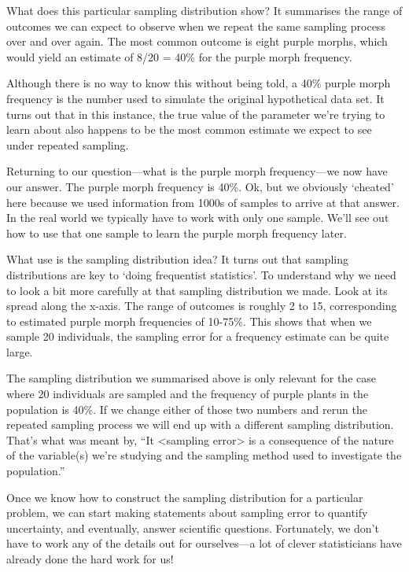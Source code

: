 \documentclass[
]{book}
\begin{document}
What does this particular sampling distribution show? It summarises the range of outcomes we can expect to observe when we repeat the same sampling process over and over again. The most common outcome is eight purple morphs, which would yield an estimate of 8/20 = 40\% for the purple morph frequency.

Although there is no way to know this without being told, a 40\% purple morph frequency is the number used to simulate the original hypothetical data set. It turns out that in this instance, the true value of the parameter we're trying to learn about also happens to be the most common estimate we expect to see under repeated sampling.

Returning to our question---what is the purple morph frequency---we now have our answer. The purple morph frequency is 40\%. Ok, but we obviously `cheated' here because we used information from 1000s of samples to arrive at that answer. In the real world we typically have to work with only one sample. We'll see out how to use that one sample to learn the purple morph frequency later.

What use is the sampling distribution idea? It turns out that sampling distributions are key to `doing frequentist statistics'. To understand why we need to look a bit more carefully at that sampling distribution we made. Look at its spread along the x-axis. The range of outcomes is roughly 2 to 15, corresponding to estimated purple morph frequencies of 10-75\%. This shows that when we sample 20 individuals, the sampling error for a frequency estimate can be quite large.

The sampling distribution we summarised above is only relevant for the case where 20 individuals are sampled and the frequency of purple plants in the population is 40\%. If we change either of those two numbers and rerun the repeated sampling process we will end up with a different sampling distribution. That's what was meant by, ``It \textless sampling error\textgreater{} is a consequence of the nature of the variable(s) we're studying and the sampling method used to investigate the population.''

Once we know how to construct the sampling distribution for a particular problem, we can start making statements about sampling error to quantify uncertainty, and eventually, answer scientific questions. Fortunately, we don't have to work any of the details out for ourselves---a lot of clever statisticians have already done the hard work for us!
\end{document}
